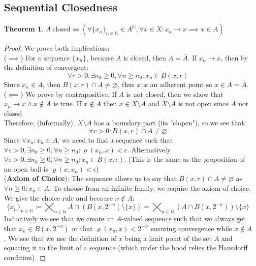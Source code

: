 \documentclass{article}
\newtheorem{thm}{Theorem}[section]
\begin{document}
\subsection{Sequential Closedness}
\begin{thm}
$A \ \text{closed} \iff (\forall \{x_n\}_{n \in \mathbb{N}}\in A^{\mathbb{N}}, \forall x \in X: x_n \xrightarrow{} x \implies x \in A)$
\end{thm}
\begin{proof}
We prove both implications:\\
($\implies$) For a sequence $\{x_n\}$, because $A$ is closed, then $A = \bar{A}$. If $x_n \xrightarrow{} x$, then by the definition of convergent:
\begin{equation*}
    \forall r > 0, \exists n_0 \geqslant 0, \forall n \geqslant n_0: x_n \in B(x, r) 
\end{equation*}
Since $x_n \in A$, then $B(x, r) \cap A \neq \varnothing$, thus $x$ is an adherent point so $x \in A = \bar{A}$.\\

($\impliedby$) We prove by contrapositive. If $A$ is not closed, then we show that $x_n \xrightarrow{} x \land x \notin A$ is true. If $x \notin A$ then $x \in X \setminus A$ and $X \setminus A$ is not open since $A$ not closed.\\

Therefore, (informally), $X \setminus A$ has a boundary part (its "clopen"), so we see that:
\begin{equation*}
    \forall r > 0: B(x, r) \cap A \neq \varnothing
\end{equation*}
Since $\forall x_n: x_n \in A$, we need to find a sequence such that $\forall \epsilon > 0, \exists n_0 \geqslant 0, \forall n \geqslant n_0: \varrho(x_n, x) < \epsilon$. Alternatively $\forall \epsilon > 0, \exists n_0 \geqslant 0, \forall n \geqslant n_0: x_n \in B(x, \epsilon)$. (This is the same as the proposition of an open ball is $\varrho(x, x_n) < \epsilon$)\\

(\textbf{Axiom of Choice}): The sequence allows us to say that $B(x, r) \cap A \neq \varnothing$ as $\forall n \geqslant 0: x_n \in A$. To choose from an infinite family, we require the axiom of choice. We give the choice rule and because $x \notin A$:
\begin{equation*}
    \{x_n\}_{n \in \mathbb{N}} \coloneq \bigtimes_{n \in \mathbb{N}} A \cap (B(x, 2^{-n})\setminus\{x\}) = \bigtimes_{n \in \mathbb{N}}(A \cap B(x, 2^{-n}))\setminus \{x\}
\end{equation*}
Inductively we see that we create an $A$-valued sequence such that we always get that $x_n \in B(x, 2^{-n})$ or that $\varrho(x_n, x) < 2^{-n}$ ensuring convergence while $x \notin A$. We see that we use the definition of $x$ being a limit point of the set $A$ and equating it to the limit of a sequence (which under the hood relies the Hausdorff condition).
\end{proof}
\end{document}

